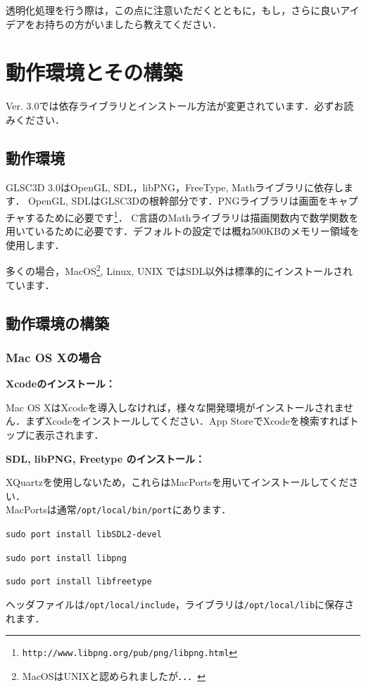 \documentclass[a4paper,12pt]{jsarticle}%
\begin{document}
透明化処理を行う際は，この点に注意いただくとともに，もし，さらに良いアイデアをお持ちの方がいましたら教えてください．

\newpage
\section{動作環境とその構築}
Ver. 3.0では依存ライブラリとインストール方法が変更されています．必ずお読みください．

\subsection{動作環境}

GLSC3D 3.0はOpenGL, SDL，libPNG，FreeType, Mathライブラリに依存します．
OpenGL, SDLはGLSC3Dの根幹部分です．PNGライブラリは画面をキャプチャするために必要です\footnote{\verb|http://www.libpng.org/pub/png/libpng.html|}．
C言語のMathライブラリは描画関数内で数学関数を用いているために必要です．デフォルトの設定では概ね500KBのメモリー領域を使用します．

多くの場合，MacOS\footnote{MacOSはUNIXと認められましたが．．．}, Linux, UNIX ではSDL以外は標準的にインストールされています．

\subsection{動作環境の構築}

\subsubsection{Mac OS Xの場合}

{\bf Xcodeのインストール：}

Mac OS XはXcodeを導入しなければ，様々な開発環境がインストールされません．まずXcodeをインストールしてください．App StoreでXcodeを検索すればトップに表示されます．

{\bf SDL, libPNG, Freetype のインストール：}

XQuartzを使用しないため，これらはMacPortsを用いてインストールしてください．\\MacPortsは通常\verb|/opt/local/bin/port|にあります．

\verb|sudo port install libSDL2-devel|

\verb|sudo port install libpng|

\verb|sudo port install libfreetype|

ヘッダファイルは\verb|/opt/local/include|，ライブラリは\verb|/opt/local/lib|に保存されます．
\end{document}
